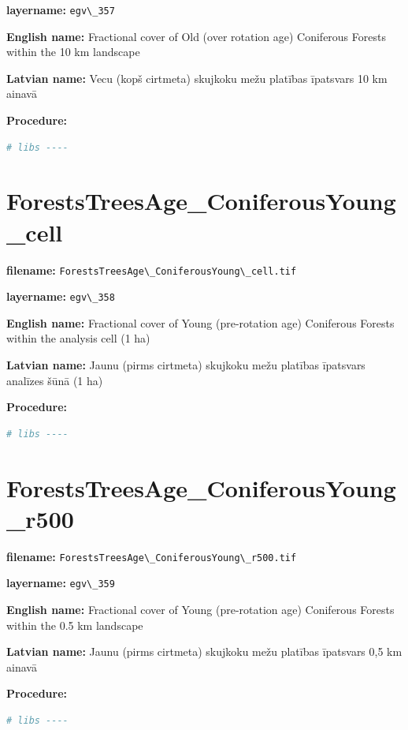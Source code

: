 \documentclass[
]{book}
\newcommand{\passthrough}[1]{#1}
\begin{document}
\textbf{layername:} \passthrough{\lstinline!egv\_357!}

\textbf{English name:} Fractional cover of Old (over rotation age) Coniferous Forests within the 10 km landscape

\textbf{Latvian name:} Vecu (kopš cirtmeta) skujkoku mežu platības īpatsvars 10 km ainavā

\textbf{Procedure:}

\begin{lstlisting}[language=R]
# libs ----
\end{lstlisting}

\section{ForestsTreesAge\_ConiferousYoung\_cell}\label{ch06.358}

\textbf{filename:} \passthrough{\lstinline!ForestsTreesAge\_ConiferousYoung\_cell.tif!}

\textbf{layername:} \passthrough{\lstinline!egv\_358!}

\textbf{English name:} Fractional cover of Young (pre-rotation age) Coniferous Forests within the analysis cell (1 ha)

\textbf{Latvian name:} Jaunu (pirms cirtmeta) skujkoku mežu platības īpatsvars analīzes šūnā (1 ha)

\textbf{Procedure:}

\begin{lstlisting}[language=R]
# libs ----
\end{lstlisting}

\section{ForestsTreesAge\_ConiferousYoung\_r500}\label{ch06.359}

\textbf{filename:} \passthrough{\lstinline!ForestsTreesAge\_ConiferousYoung\_r500.tif!}

\textbf{layername:} \passthrough{\lstinline!egv\_359!}

\textbf{English name:} Fractional cover of Young (pre-rotation age) Coniferous Forests within the 0.5 km landscape

\textbf{Latvian name:} Jaunu (pirms cirtmeta) skujkoku mežu platības īpatsvars 0,5 km ainavā

\textbf{Procedure:}

\begin{lstlisting}[language=R]
# libs ----
\end{lstlisting}
\end{document}
